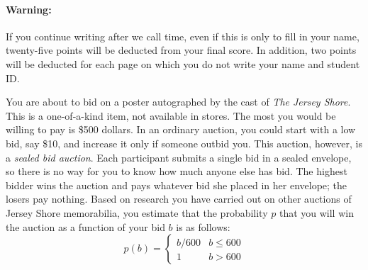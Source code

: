 \documentclass[addpoints,12pt]{exam}
\begin{document}
\paragraph{Warning:} If you continue writing after we call time, even if this is only to fill in your name, twenty-five points will be deducted from your final score. In addition, two points will be deducted for each page on which you do not write your name and student ID. \\

\noindent{}

\newpage
\begin{questions}

\question You are about to bid on a poster autographed by the cast of \emph{The Jersey Shore}. This is a one-of-a-kind item, not available in stores. The most you would be willing to pay is \$500 dollars. In an ordinary auction, you could start with a low bid, say \$10, and increase it only if someone outbid you. This auction, however, is a \emph{sealed bid auction}. Each participant submits a single bid in a sealed envelope, so there is no way for you to know how much anyone else has bid. The highest bidder wins the auction and pays whatever bid she placed in her envelope; the losers pay nothing. Based on research you have carried out on other auctions of Jersey Shore memorabilia, you estimate that the probability $p$ that you will win the auction as a function of your bid $b$ is as follows:
	$$p(b) = \left\{ \begin{array}{ll}
			b/600 & b \leq 600\\
			1 & b > 600
	    \end{array}\right.$$
\end{questions}
\end{document}
